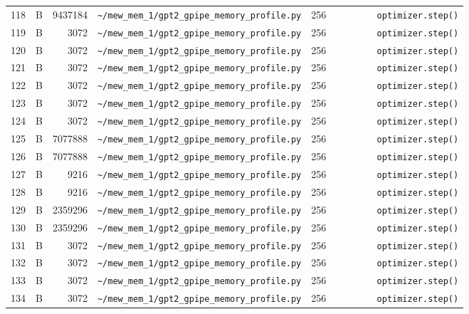 \documentclass{article}
\begin{document}
\begin{longtable}{r l r p{6.5cm} r p{7.0cm}}
118 & B & 9437184 & \lstinline|~/mew_mem_1/gpt2_gpipe_memory_profile.py| & 256 & \lstinline|        optimizer.step()| \\
119 & B & 3072 & \lstinline|~/mew_mem_1/gpt2_gpipe_memory_profile.py| & 256 & \lstinline|        optimizer.step()| \\
120 & B & 3072 & \lstinline|~/mew_mem_1/gpt2_gpipe_memory_profile.py| & 256 & \lstinline|        optimizer.step()| \\
121 & B & 3072 & \lstinline|~/mew_mem_1/gpt2_gpipe_memory_profile.py| & 256 & \lstinline|        optimizer.step()| \\
122 & B & 3072 & \lstinline|~/mew_mem_1/gpt2_gpipe_memory_profile.py| & 256 & \lstinline|        optimizer.step()| \\
123 & B & 3072 & \lstinline|~/mew_mem_1/gpt2_gpipe_memory_profile.py| & 256 & \lstinline|        optimizer.step()| \\
124 & B & 3072 & \lstinline|~/mew_mem_1/gpt2_gpipe_memory_profile.py| & 256 & \lstinline|        optimizer.step()| \\
125 & B & 7077888 & \lstinline|~/mew_mem_1/gpt2_gpipe_memory_profile.py| & 256 & \lstinline|        optimizer.step()| \\
126 & B & 7077888 & \lstinline|~/mew_mem_1/gpt2_gpipe_memory_profile.py| & 256 & \lstinline|        optimizer.step()| \\
127 & B & 9216 & \lstinline|~/mew_mem_1/gpt2_gpipe_memory_profile.py| & 256 & \lstinline|        optimizer.step()| \\
128 & B & 9216 & \lstinline|~/mew_mem_1/gpt2_gpipe_memory_profile.py| & 256 & \lstinline|        optimizer.step()| \\
129 & B & 2359296 & \lstinline|~/mew_mem_1/gpt2_gpipe_memory_profile.py| & 256 & \lstinline|        optimizer.step()| \\
130 & B & 2359296 & \lstinline|~/mew_mem_1/gpt2_gpipe_memory_profile.py| & 256 & \lstinline|        optimizer.step()| \\
131 & B & 3072 & \lstinline|~/mew_mem_1/gpt2_gpipe_memory_profile.py| & 256 & \lstinline|        optimizer.step()| \\
132 & B & 3072 & \lstinline|~/mew_mem_1/gpt2_gpipe_memory_profile.py| & 256 & \lstinline|        optimizer.step()| \\
133 & B & 3072 & \lstinline|~/mew_mem_1/gpt2_gpipe_memory_profile.py| & 256 & \lstinline|        optimizer.step()| \\
134 & B & 3072 & \lstinline|~/mew_mem_1/gpt2_gpipe_memory_profile.py| & 256 & \lstinline|        optimizer.step()| \\

\end{longtable}
\end{document}
